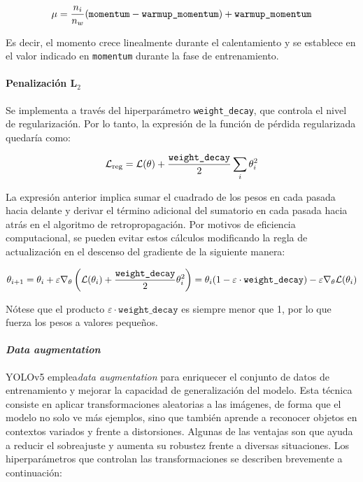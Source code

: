 \documentclass{article}
\begin{document}
	\begin{equation}
		\mu = \frac{n_i}{n_w}(\text{\texttt{momentum}} - \text{\texttt{warmup\_momentum}}) + \text{\texttt{warmup\_momentum}}
	\end{equation}
	
	Es decir, el momento crece linealmente durante el calentamiento y se establece en el valor indicado en \texttt{momentum} durante la fase de entrenamiento.
	
	\paragraph{Penalización L$_2$} $$ $$
	Se implementa a través del hiperparámetro \texttt{weight\_decay}, que controla el nivel de regularización. Por lo tanto, la expresión de la función de pérdida regularizada quedaría como:
	
	\begin{equation}
		\mathcal{L}_{\text{reg}} = \mathcal{L}(\theta) + \frac{\text{\texttt{weight\_decay}}}{2}\sum_i \theta_i^2
	\end{equation}
	
	La expresión anterior implica sumar el cuadrado de los pesos en cada pasada hacia delante y derivar el término adicional del sumatorio en cada pasada hacia atrás en el algoritmo de retropropagación. Por motivos de eficiencia computacional, se pueden evitar estos cálculos modificando la regla de actualización en el descenso del gradiente de la siguiente manera:
	
	\begin{equation}
		\theta_{i+1} = \theta_i + \varepsilon \nabla_{\theta}\left(\mathcal{L}(\theta_i) + \frac{\text{\texttt{weight\_decay}}}{2} \theta_i^2 \right) = \theta_i (1 - \varepsilon \cdot \text{\texttt{weight\_decay}}) - \varepsilon \nabla_{\theta} \mathcal{L}(\theta_i)
	\end{equation}
	
	Nótese que el producto $\varepsilon \cdot \texttt{weight\_decay}$ es siempre menor que 1, por lo que fuerza los pesos a valores pequeños.
	
	
	\paragraph{\textit{Data augmentation}} $$ $$
	YOLOv5 emplea\textit{data augmentation} para enriquecer el conjunto de datos de entrenamiento y mejorar la capacidad de generalización del modelo. Esta técnica consiste en aplicar transformaciones aleatorias a las imágenes, de forma que el modelo no solo ve más ejemplos, sino que también aprende a reconocer objetos en contextos variados y frente a distorsiones. Algunas de las ventajas son que ayuda a reducir el sobreajuste y aumenta su robustez frente a diversas situaciones. Los hiperparámetros que controlan las transformaciones se describen brevemente a continuación:
	
\end{document}
